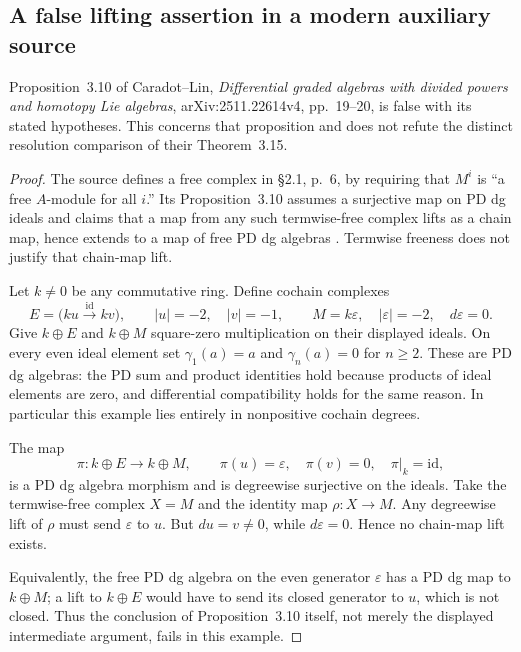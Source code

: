 \subsection{A false lifting assertion in a modern auxiliary source}

\begin{proposition}
\label{sa08:D031}
Proposition~3.10 of Caradot--Lin,
\emph{Differential graded algebras with divided powers and
homotopy Lie algebras}, arXiv:2511.22614v4,
pp.~19--20, is false with its stated hypotheses.
This concerns that proposition and does not refute
the distinct resolution comparison of their Theorem~3.15.
\end{proposition}

\begin{proof}
The source defines a free complex in \S2.1, p.~6,
by requiring that \(M^i\) is ``a free \(A\)-module for
all \(i\).'' Its Proposition~3.10 assumes a surjective
map on PD dg ideals and claims that a map from any
such termwise-free complex lifts as a chain map, hence
extends to a map of free PD dg algebras
\cite[\S2.1, p.~6; Proposition~3.10, pp.~19--20]{D_CaradotLin2026}.
Termwise freeness does not justify that chain-map lift.

Let \(k\ne0\) be any commutative ring. Define cochain
complexes
\[
 E=\bigl(ku\xrightarrow{\mathrm{id}}kv\bigr),
       \qquad |u|=-2,\quad |v|=-1,
 \qquad
 M=k\varepsilon,\quad |\varepsilon|=-2,\quad d\varepsilon=0.
 \tag{D-31a}
\]
Give \(k\oplus E\) and \(k\oplus M\) square-zero
multiplication on their displayed ideals. On every
even ideal element set \(\gamma_1(a)=a\) and
\(\gamma_n(a)=0\) for \(n\ge2\).
These are PD dg algebras: the PD sum and product
identities hold because products of ideal elements
are zero, and differential compatibility holds for
the same reason. In particular this example lies
entirely in nonpositive cochain degrees.

The map
\[
 \pi:k\oplus E\longrightarrow k\oplus M,
 \qquad \pi(u)=\varepsilon,\quad\pi(v)=0,
 \quad\pi|_k=\mathrm{id},
 \tag{D-31b}
\]
is a PD dg algebra morphism and is degreewise surjective
on the ideals. Take the termwise-free complex \(X=M\)
and the identity map \(\rho:X\to M\).
Any degreewise lift of \(\rho\) must send
\(\varepsilon\) to \(u\). But \(du=v\ne0\), while
\(d\varepsilon=0\). Hence no chain-map lift exists.

Equivalently, the free PD dg algebra on the even
generator \(\varepsilon\) has a PD dg map to
\(k\oplus M\); a lift to \(k\oplus E\) would have
to send its closed generator to \(u\), which is not
closed. Thus the conclusion of Proposition~3.10 itself,
not merely the displayed intermediate argument,
fails in this example.
\end{proof}

